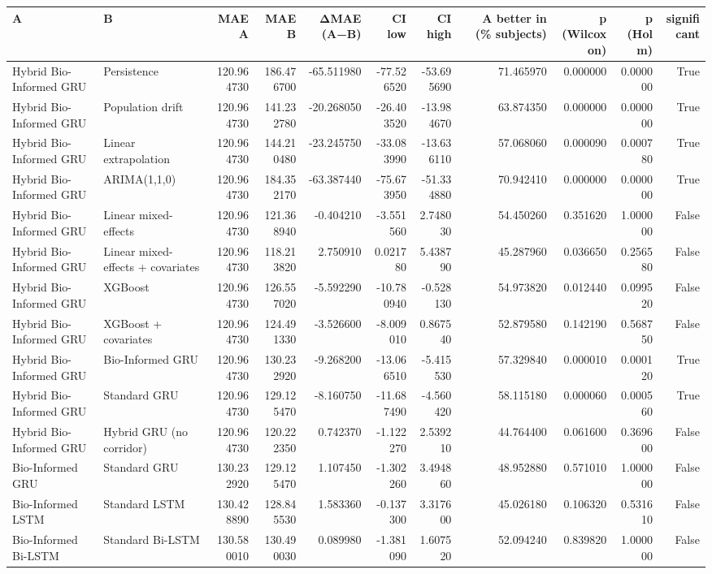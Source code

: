 \begin{tabular}{llrrrrrrrrr}
\toprule
A & B & MAE A & MAE B & ΔMAE (A−B) & CI low & CI high & A better in (\% subjects) & p (Wilcoxon) & p (Holm) & significant \\
\midrule
Hybrid Bio-Informed GRU & Persistence & 120.964730 & 186.476700 & -65.511980 & -77.526520 & -53.695690 & 71.465970 & 0.000000 & 0.000000 & True \\
Hybrid Bio-Informed GRU & Population drift & 120.964730 & 141.232780 & -20.268050 & -26.403520 & -13.984670 & 63.874350 & 0.000000 & 0.000000 & True \\
Hybrid Bio-Informed GRU & Linear extrapolation & 120.964730 & 144.210480 & -23.245750 & -33.083990 & -13.636110 & 57.068060 & 0.000090 & 0.000780 & True \\
Hybrid Bio-Informed GRU & ARIMA(1,1,0) & 120.964730 & 184.352170 & -63.387440 & -75.673950 & -51.334880 & 70.942410 & 0.000000 & 0.000000 & True \\
Hybrid Bio-Informed GRU & Linear mixed-effects & 120.964730 & 121.368940 & -0.404210 & -3.551560 & 2.748030 & 54.450260 & 0.351620 & 1.000000 & False \\
Hybrid Bio-Informed GRU & Linear mixed-effects + covariates & 120.964730 & 118.213820 & 2.750910 & 0.021780 & 5.438790 & 45.287960 & 0.036650 & 0.256580 & False \\
Hybrid Bio-Informed GRU & XGBoost & 120.964730 & 126.557020 & -5.592290 & -10.780940 & -0.528130 & 54.973820 & 0.012440 & 0.099520 & False \\
Hybrid Bio-Informed GRU & XGBoost + covariates & 120.964730 & 124.491330 & -3.526600 & -8.009010 & 0.867540 & 52.879580 & 0.142190 & 0.568750 & False \\
Hybrid Bio-Informed GRU & Bio-Informed GRU & 120.964730 & 130.232920 & -9.268200 & -13.066510 & -5.415530 & 57.329840 & 0.000010 & 0.000120 & True \\
Hybrid Bio-Informed GRU & Standard GRU & 120.964730 & 129.125470 & -8.160750 & -11.687490 & -4.560420 & 58.115180 & 0.000060 & 0.000560 & True \\
Hybrid Bio-Informed GRU & Hybrid GRU (no corridor) & 120.964730 & 120.222350 & 0.742370 & -1.122270 & 2.539210 & 44.764400 & 0.061600 & 0.369600 & False \\
Bio-Informed GRU & Standard GRU & 130.232920 & 129.125470 & 1.107450 & -1.302260 & 3.494860 & 48.952880 & 0.571010 & 1.000000 & False \\
Bio-Informed LSTM & Standard LSTM & 130.428890 & 128.845530 & 1.583360 & -0.137300 & 3.317600 & 45.026180 & 0.106320 & 0.531610 & False \\
Bio-Informed Bi-LSTM & Standard Bi-LSTM & 130.580010 & 130.490030 & 0.089980 & -1.381090 & 1.607520 & 52.094240 & 0.839820 & 1.000000 & False \\
\bottomrule
\end{tabular}
